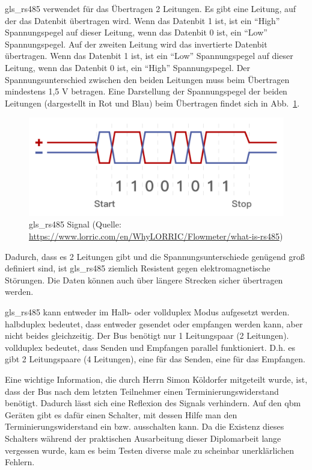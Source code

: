 \gls{gls_rs485} verwendet für das Übertragen 2 Leitungen. Es gibt eine Leitung, auf der das Datenbit übertragen wird. Wenn das Datenbit 1 ist, ist ein \enquote{High} Spannungspegel auf dieser Leitung, wenn das Datenbit 0 ist, ein \enquote{Low} Spannungspegel. Auf der zweiten Leitung wird das invertierte Datenbit übertragen. Wenn das Datenbit 1 ist, ist ein \enquote{Low} Spannungspegel auf dieser Leitung, wenn das Datenbit 0 ist, ein \enquote{High} Spannungspegel. Der Spannungsunterschied zwischen den beiden Leitungen muss beim Übertragen mindestens 1,5 V betragen. \cite[vgl.][]{Kugelstadt:2021}
Eine Darstellung der Spannungspegel der beiden Leitungen (dargestellt in Rot und Blau) beim Übertragen findet sich in Abb.~\ref{fig:rs485_signal}.
\begin{figure}[H]
	\centering
	\includegraphics[width=0.5\linewidth]{Bilder/RS485_signal_illustration}
	\caption{\gls{gls_rs485} Signal (Quelle: \url{https://www.lorric.com/en/WhyLORRIC/Flowmeter/what-is-rs485})}
	\label{fig:rs485_signal}
\end{figure}

Dadurch, dass es 2 Leitungen gibt und die Spannungsunterschiede genügend groß definiert sind, ist \gls{gls_rs485} ziemlich Resistent gegen elektromagnetische Störungen. Die Daten können auch über längere Strecken sicher übertragen werden. \cite[vgl.][]{Kugelstadt:2021, Heinen_Elektronik_GmbH:o.J.}

\gls{gls_rs485} kann entweder im Halb- oder \gls{vollduplex} Modus aufgesetzt werden. \newline \gls{halbduplex} bedeutet, dass entweder gesendet oder empfangen werden kann, aber nicht beides gleichzeitig. Der Bus benötigt nur 1 Leitungspaar (2 Leitungen). \newline \gls{vollduplex} bedeutet, dass Senden und Empfangen parallel funktioniert. D.h. es gibt 2 Leitungspaare (4 Leitungen), eine für das Senden, eine für das Empfangen. \cite[vgl.][]{Kugelstadt:2021} 

Eine wichtige Information, die durch Herrn Simon Köldorfer mitgeteilt wurde, ist, dass der Bus nach dem letzten Teilnehmer einen Terminierungswiderstand benötigt. Dadurch lässt sich eine Reflexion des Signals verhindern. \cite[vgl.][]{Kugelstadt:2021} Auf den \gls{qbm} Geräten gibt es dafür einen Schalter, mit dessen Hilfe man den Terminierungswiderstand ein bzw. ausschalten kann. Da die Existenz dieses Schalters während der praktischen Ausarbeitung dieser Diplomarbeit lange vergessen wurde, kam es beim Testen diverse male zu scheinbar unerklärlichen Fehlern.

